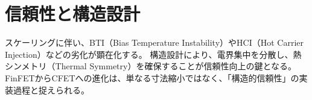 \section{信頼性と構造設計}
スケーリングに伴い、BTI（Bias Temperature Instability）やHCI（Hot Carrier Injection）などの劣化が顕在化する。  
構造設計により、電界集中を分散し、熱シンメトリ（Thermal Symmetry）を確保することが信頼性向上の鍵となる。  
FinFETからCFETへの進化は、単なる寸法縮小ではなく、「構造的信頼性」の実装過程と捉えられる。
